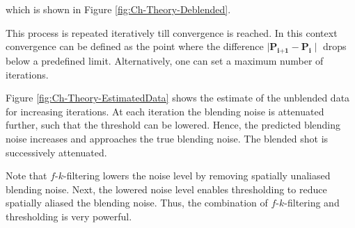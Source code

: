 which is shown in Figure \ref{fig:Ch-Theory-Deblended}.

This process is repeated iteratively till convergence is reached. In this context convergence can be defined as the point where the difference $\mid \textbf{\^P}_\textbf{i+1} - \textbf{\^{P}}_\textbf{i} \mid$ drops below a predefined limit. Alternatively, one can set a maximum number of iterations. 

Figure \ref{fig:Ch-Theory-EstimatedData} shows the estimate of the unblended data for increasing iterations. At each iteration the blending noise is attenuated further, such that the threshold can be lowered. Hence, the predicted blending noise increases and approaches the true blending noise. The blended shot is successively  attenuated.

Note that $f$-$k$-filtering lowers the noise level by removing spatially unaliased blending noise. Next, the lowered noise level enables thresholding to reduce spatially aliased the blending noise. Thus, the combination of $f$-$k$-filtering and thresholding is very powerful.


